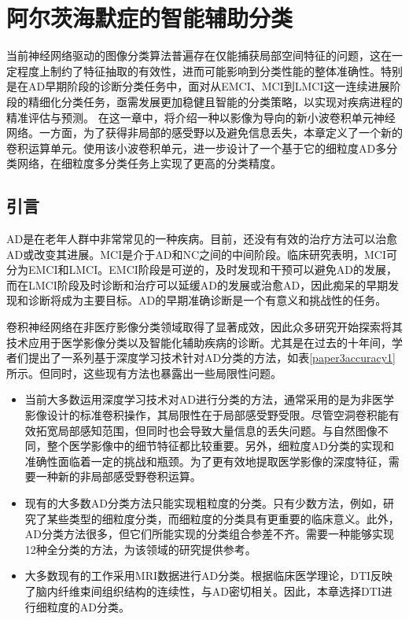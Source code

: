 \chapter{阿尔茨海默症的智能辅助分类} 
\label{chapter:fineClassify}
当前神经网络驱动的图像分类算法普遍存在仅能捕获局部空间特征的问题，这在一定程度上制约了特征抽取的有效性，进而可能影响到分类性能的整体准确性。特别是在AD早期阶段的诊断分类任务中，面对从EMCI、MCI到LMCI这一连续进展阶段的精细化分类任务，亟需发展更加稳健且智能的分类策略，以实现对疾病进程的精准评估与预测。
在这一章中，将介绍一种以影像为导向的新小波卷积单元神经网络。一方面，为了获得非局部的感受野以及避免信息丢失，本章定义了一个新的卷积运算单元。使用该小波卷积单元，进一步设计了一个基于它的细粒度AD多分类网络\cite{wen2023fine}，在细粒度多分类任务上实现了更高的分类精度。

\section{引言}
AD是在老年人群中非常常见的一种疾病。目前，还没有有效的治疗方法可以治愈AD或改变其进展。MCI是介于AD和NC之间的中间阶段。临床研究表明，MCI可分为EMCI和LMCI。EMCI阶段是可逆的，及时发现和干预可以避免AD的发展，而在LMCI阶段及时诊断和治疗可以延缓AD的发展或治愈AD，因此痴呆的早期发现和诊断将成为主要目标。AD的早期准确诊断是一个有意义和挑战性的任务。


卷积神经网络在非医疗影像分类领域取得了显著成效，因此众多研究开始探索将其技术应用于医学影像分类以及智能化辅助疾病的诊断。尤其是在过去的十年间，学者们提出了一系列基于深度学习技术针对AD分类的方法，如表\ref{paper3accuracy1}所示。但同时，这些现有方法也暴露出一些局限性问题。
\begin{itemize}
    \item 当前大多数运用深度学习技术对AD进行分类的方法，通常采用的是为非医学影像设计的标准卷积操作，其局限性在于局部感受野受限。尽管空洞卷积能有效拓宽局部感知范围，但同时也会导致大量信息的丢失问题。与自然图像不同，整个医学影像中的细节特征都比较重要。另外，细粒度AD分类的实现和准确性面临着一定的挑战和瓶颈。为了更有效地提取医学影像的深度特征，需要一种新的非局部感受野卷积运算。
    \item 现有的大多数AD分类方法只能实现粗粒度的分类。只有少数方法，例如\cite{Fangmeie2022,de2021dti}，研究了某些类型的细粒度分类，而细粒度的分类具有更重要的临床意义。此外，AD分类方法很多，但它们所能实现的分类组合参差不齐。需要一种能够实现12种全分类的方法，为该领域的研究提供参考。
    \item 大多数现有的工作采用MRI数据进行AD分类。根据临床医学理论，DTI反映了脑内纤维束间组织结构的连续性，与AD密切相关。因此，本章选择DTI进行细粒度的AD分类。
\end{itemize}

